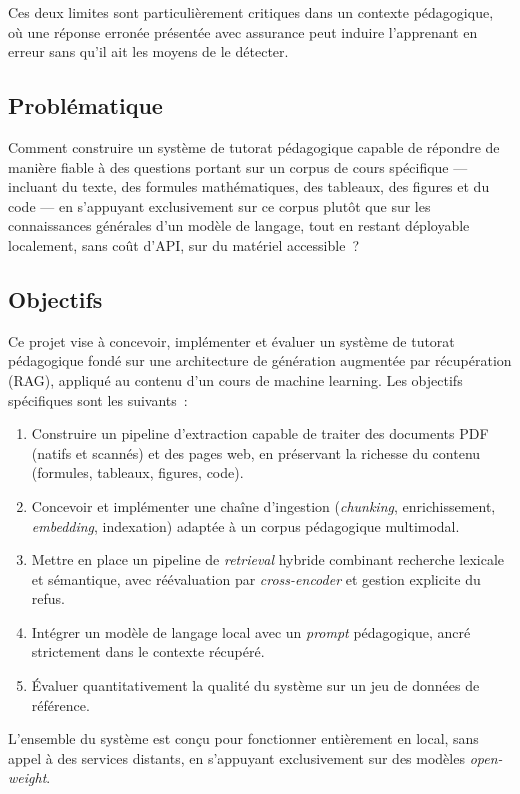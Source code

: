 \documentclass[11pt,a4paper]{article}
\begin{document}
Ces deux limites sont particulièrement critiques dans un contexte pédagogique, où une réponse erronée présentée avec assurance peut induire l'apprenant en erreur sans qu'il ait les moyens de le détecter.

\subsection{Problématique}

Comment construire un système de tutorat pédagogique capable de répondre de manière fiable à des questions portant sur un corpus de cours spécifique --- incluant du texte, des formules mathématiques, des tableaux, des figures et du code --- en s'appuyant exclusivement sur ce corpus plutôt que sur les connaissances générales d'un modèle de langage, tout en restant déployable localement, sans coût d'API, sur du matériel accessible~?

\subsection{Objectifs}

Ce projet vise à concevoir, implémenter et évaluer un système de tutorat pédagogique fondé sur une architecture de génération augmentée par récupération (RAG), appliqué au contenu d'un cours de machine learning. Les objectifs spécifiques sont les suivants~:

\begin{enumerate}
  \item Construire un pipeline d'extraction capable de traiter des documents PDF (natifs et scannés) et des pages web, en préservant la richesse du contenu (formules, tableaux, figures, code).
  \item Concevoir et implémenter une chaîne d'ingestion (\textit{chunking}, enrichissement, \textit{embedding}, indexation) adaptée à un corpus pédagogique multimodal.
  \item Mettre en place un pipeline de \textit{retrieval} hybride combinant recherche lexicale et sémantique, avec réévaluation par \textit{cross-encoder} et gestion explicite du refus.
  \item Intégrer un modèle de langage local avec un \textit{prompt} pédagogique, ancré strictement dans le contexte récupéré.
  \item Évaluer quantitativement la qualité du système sur un jeu de données de référence.
\end{enumerate}

L'ensemble du système est conçu pour fonctionner entièrement en local, sans appel à des services distants, en s'appuyant exclusivement sur des modèles \textit{open-weight}.
\end{document}
